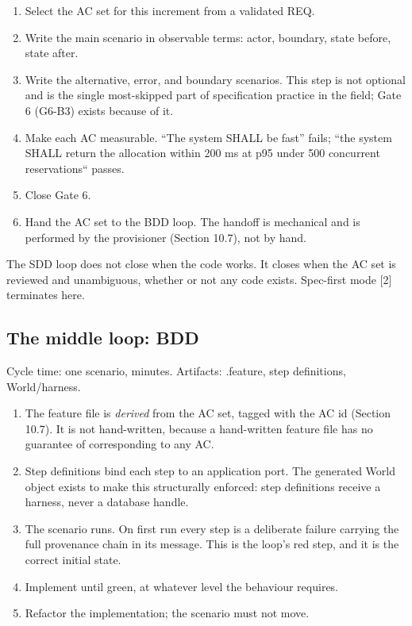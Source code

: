 \documentclass[11pt,a4paper]{article}
\begin{document}
\begin{enumerate}[leftmargin=*,nosep,topsep=2pt]
\item Select the AC set for this increment from a validated REQ.
\item Write the main scenario in observable terms: actor, boundary, state    before, state after.
\item Write the alternative, error, and boundary scenarios. This step is not    optional and is the single most-skipped part of specification practice    in the field; Gate 6 (G6-B3) exists because of it.
\item Make each AC measurable. ``The system SHALL be fast'' fails; ``the system    SHALL return the allocation within 200 ms at p95 under 500 concurrent    reservations`` passes.
\item Close Gate 6.
\item Hand the AC set to the BDD loop. The handoff is mechanical and is    performed by the provisioner (Section 10.7), not by hand.
\end{enumerate}

The SDD loop does not close when the code works. It closes when the AC set is reviewed and unambiguous, whether or not any code exists. Spec-first mode [2] terminates here.

\subsection{The middle loop: BDD}

Cycle time: one scenario, minutes. Artifacts: .feature, step definitions, World/harness.

\begin{enumerate}[leftmargin=*,nosep,topsep=2pt]
\item The feature file is \emph{derived} from the AC set, tagged with the AC id    (Section 10.7). It is not hand-written, because a hand-written feature    file has no guarantee of corresponding to any AC.
\item Step definitions bind each step to an application port. The generated    World object exists to make this structurally enforced: step definitions    receive a harness, never a database handle.
\item The scenario runs. On first run every step is a deliberate failure    carrying the full provenance chain in its message. This is the loop's    red step, and it is the correct initial state.
\item Implement until green, at whatever level the behaviour requires.
\item Refactor the implementation; the scenario must not move.
\end{enumerate}
\end{document}

